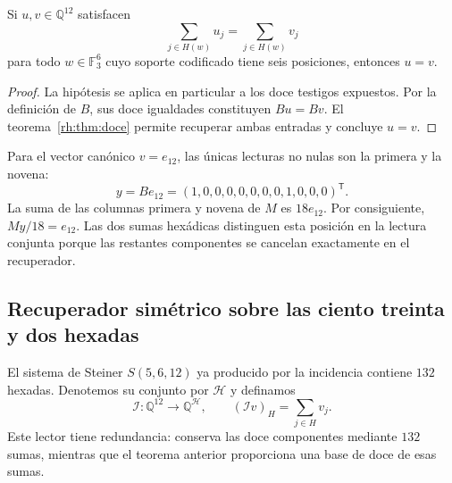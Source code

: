 \begin{corollary}
Si $u,v\in\mathbb Q^{12}$ satisfacen
\[
\sum_{j\in H(w)}u_j=\sum_{j\in H(w)}v_j
\]
para todo $w\in\mathbb F_3^6$ cuyo soporte codificado tiene seis
posiciones, entonces $u=v$.
\end{corollary}
\begin{proof}
La hipótesis se aplica en particular a los doce testigos expuestos.
Por la definición de $B$, sus doce igualdades constituyen $Bu=Bv$.
El teorema~\ref{rh:thm:doce} permite recuperar ambas entradas y
concluye $u=v$.
\end{proof}

\begin{example}
Para el vector canónico $v=e_{12}$, las únicas lecturas no nulas son
la primera y la novena:
\[
y=Be_{12}=(1,0,0,0,0,0,0,0,1,0,0,0)^{\mathsf T}.
\]
La suma de las columnas primera y novena de $M$ es $18e_{12}$.
Por consiguiente, $My/18=e_{12}$. Las dos sumas hexádicas distinguen
esta posición en la lectura conjunta porque las restantes componentes
se cancelan exactamente en el recuperador.
\end{example}

\subsection{Recuperador simétrico sobre las ciento treinta y dos hexadas}

El sistema de Steiner $S(5,6,12)$ ya producido por la incidencia
contiene $132$ hexadas. Denotemos su conjunto por $\mathcal H$ y
definamos
\[
\mathcal I:\mathbb Q^{12}\longrightarrow\mathbb Q^{\mathcal H},
\qquad
(\mathcal I v)_H=\sum_{j\in H}v_j.
\]
Este lector tiene redundancia: conserva las doce componentes mediante
$132$ sumas, mientras que el teorema anterior proporciona una base de
doce de esas sumas.

